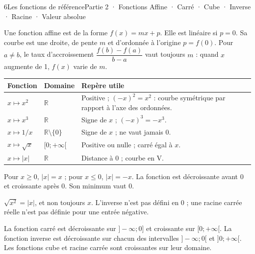 \begin{ouverture}[courbe]{6}{Les fonctions de référence}{Partie 2 · Fonctions}
{Affine · Carré · Cube · Inverse · Racine · Valeur absolue}
\end{ouverture}
\pagestyle{otMain}\essentiel\fontsize{11}{15}\selectfont
{}
\begin{definition}Une fonction affine est de la forme $f(x)=mx+p$. Elle est linéaire si $p=0$. Sa courbe est une droite, de pente $m$ et d’ordonnée à l’origine $p=f(0)$. Pour $a\ne b$, le taux d’accroissement $\dfrac{f(b)-f(a)}{b-a}$ vaut toujours $m$ : quand $x$ augmente de 1, $f(x)$ varie de $m$.\end{definition}
\begin{propriete}
\begin{tabularx}{\linewidth}{@{}lYY@{}}\toprule
Fonction & Domaine & Repère utile\\\midrule
$x\mapsto x^2$ & $\mathbb R$ & Positive ; $(-x)^2=x^2$ : courbe symétrique par rapport à l’axe des ordonnées.\\
$x\mapsto x^3$ & $\mathbb R$ & Signe de $x$ ; $(-x)^3=-x^3$.\\
$x\mapsto1/x$ & $\mathbb R\setminus\{0\}$ & Signe de $x$ ; ne vaut jamais 0.\\
$x\mapsto\sqrt x$ & $[0;+\infty[$ & Positive ou nulle ; carré égal à $x$.\\
$x\mapsto|x|$ & $\mathbb R$ & Distance à 0 ; courbe en V.\\\bottomrule
\end{tabularx}
\end{propriete}
\begin{savoirfaire}Pour $x\ge0$, $|x|=x$ ; pour $x\le0$, $|x|=-x$. La fonction est décroissante avant 0 et croissante après 0. Son minimum vaut 0.\end{savoirfaire}
\begin{attention}$\sqrt{x^2}=|x|$, et non toujours $x$. L’inverse n’est pas défini en 0 ; une racine carrée réelle n’est pas définie pour une entrée négative.\end{attention}
\clearpage
{}
\begin{propriete}
La fonction carré est décroissante sur $]-\infty;0]$ et croissante sur $[0;+\infty[$. La fonction inverse est décroissante sur chacun des intervalles $]-\infty;0[$ et $]0;+\infty[$. Les fonctions cube et racine carrée sont croissantes sur leur domaine.
\end{propriete}
